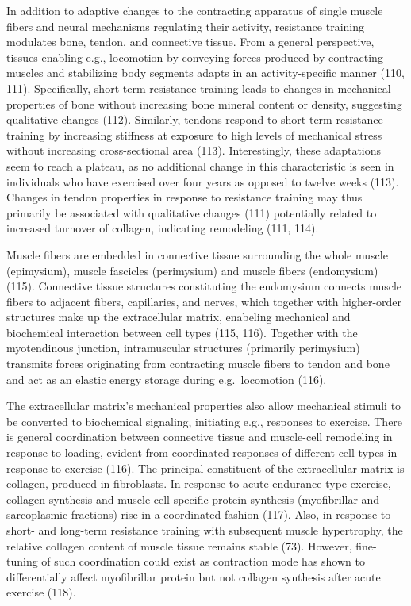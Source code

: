 \documentclass[twoside,10pt]{gihclass} %
\begin{document}
In addition to adaptive changes to the contracting apparatus of single muscle fibers and neural mechanisms regulating their activity, resistance training modulates bone, tendon, and connective tissue.
From a general perspective, tissues enabling e.g., locomotion by conveying forces produced by contracting muscles and stabilizing body segments adapts in an activity-specific manner
(110, 111).
Specifically, short term resistance training leads to changes in mechanical properties of bone without increasing bone mineral content or density, suggesting qualitative changes
(112).
Similarly, tendons respond to short-term resistance training by increasing stiffness at exposure to high levels of mechanical stress without increasing cross-sectional area
(113).
Interestingly, these adaptations seem to reach a plateau, as no additional change in this characteristic is seen in individuals who have exercised over four years as opposed to twelve weeks
(113).
Changes in tendon properties in response to resistance training may thus primarily be associated with qualitative changes
(111)
potentially related to increased turnover of collagen, indicating remodeling
(111, 114).

Muscle fibers are embedded in connective tissue surrounding the whole muscle (epimysium), muscle fascicles (perimysium) and muscle fibers (endomysium)
(115).
Connective tissue structures constituting the endomysium connects muscle fibers to adjacent fibers, capillaries, and nerves, which together with higher-order structures make up the extracellular matrix, enabeling mechanical and biochemical interaction between cell types
(115, 116).
Together with the myotendinous junction, intramuscular structures (primarily perimysium) transmits forces originating from contracting muscle fibers to tendon and bone and act as an elastic energy storage during e.g.~locomotion
(116).

The extracellular matrix's mechanical properties also allow mechanical stimuli to be converted to biochemical signaling, initiating e.g., responses to exercise.
There is general coordination between connective tissue and muscle-cell remodeling in response to loading, evident from coordinated responses of different cell types in response to exercise
(116).
The principal constituent of the extracellular matrix is collagen, produced in fibroblasts.
In response to acute endurance-type exercise, collagen synthesis and muscle cell-specific protein synthesis (myofibrillar and sarcoplasmic fractions) rise in a coordinated fashion
(117).
Also, in response to short- and long-term resistance training with subsequent muscle hypertrophy, the relative collagen content of muscle tissue remains stable
(73).
However, fine-tuning of such coordination could exist as contraction mode has shown to differentially affect myofibrillar protein but not collagen synthesis after acute exercise
(118).
\end{document}

